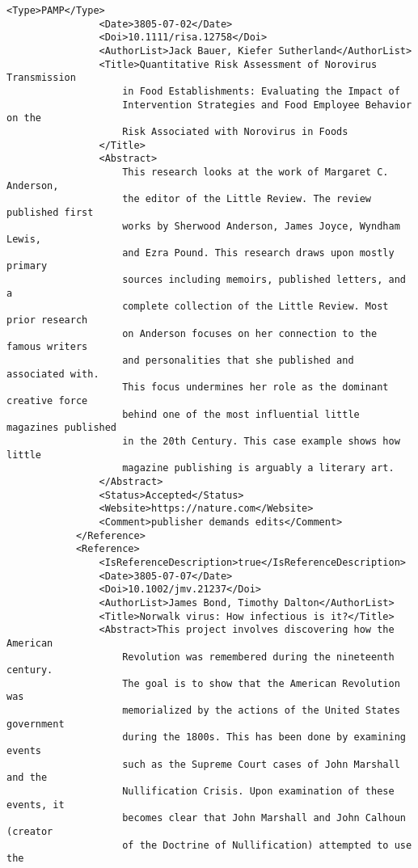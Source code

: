 \begin{lstlisting}[language=RAKIP, caption={Example of GenericModel}]
                <Type>PAMP</Type>
                <Date>3805-07-02</Date>
                <Doi>10.1111/risa.12758</Doi>
                <AuthorList>Jack Bauer, Kiefer Sutherland</AuthorList>
                <Title>Quantitative Risk Assessment of Norovirus Transmission
                    in Food Establishments: Evaluating the Impact of
                    Intervention Strategies and Food Employee Behavior on the
                    Risk Associated with Norovirus in Foods
                </Title>
                <Abstract>
                    This research looks at the work of Margaret C. Anderson,
                    the editor of the Little Review. The review published first
                    works by Sherwood Anderson, James Joyce, Wyndham Lewis,
                    and Ezra Pound. This research draws upon mostly primary
                    sources including memoirs, published letters, and a
                    complete collection of the Little Review. Most prior research
                    on Anderson focuses on her connection to the famous writers
                    and personalities that she published and associated with.
                    This focus undermines her role as the dominant creative force
                    behind one of the most influential little magazines published
                    in the 20th Century. This case example shows how little
                    magazine publishing is arguably a literary art.
                </Abstract>
                <Status>Accepted</Status>
                <Website>https://nature.com</Website>
                <Comment>publisher demands edits</Comment>
            </Reference>
            <Reference>
                <IsReferenceDescription>true</IsReferenceDescription>
                <Date>3805-07-07</Date>
                <Doi>10.1002/jmv.21237</Doi>
                <AuthorList>James Bond, Timothy Dalton</AuthorList>
                <Title>Norwalk virus: How infectious is it?</Title>
                <Abstract>This project involves discovering how the American
                    Revolution was remembered during the nineteenth century.
                    The goal is to show that the American Revolution was
                    memorialized by the actions of the United States government
                    during the 1800s. This has been done by examining events
                    such as the Supreme Court cases of John Marshall and the
                    Nullification Crisis. Upon examination of these events, it
                    becomes clear that John Marshall and John Calhoun (creator
                    of the Doctrine of Nullification) attempted to use the

\end{lstlisting}
